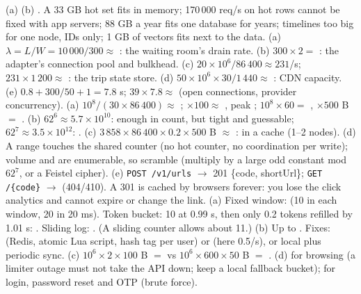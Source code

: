  (a)  (b) . A 33 GB hot set fits in memory; 170\,000 req/s on hot rows cannot be fixed with app servers; 88 GB a year fits one database for years; timelines too big for one node, IDs only; 1 GB of vectors fits next to the data.
 (a) $\lambda = L/W = 10\,000/300 \approx$ : the waiting room's drain rate. (b) $300 \times 2 =$ : the adapter's connection pool and bulkhead. (c) $20 \times 10^6/86\,400 \approx 231$/s; $231 \times 1\,200 \approx$ : the trip state store. (d) $50 \times 10^6 \times 30/1\,440 \approx$ : CDN capacity. (e) $0.8 + 300/50 + 1 = 7.8$ s; $39 \times 7.8 \approx$  (open connections, provider concurrency).
 (a) $10^8/(30 \times 86\,400) \approx$ ; $\times 100 \approx$ , peak ; $10^8 \times 60 =$ , $\times 500$ B $=$ . (b) $62^6 \approx 5.7 \times 10^{10}$: enough in count, but tight and guessable; $62^7 \approx 3.5 \times 10^{12}$: . (c) $3\,858 \times 86\,400 \times 0.2 \times 500$ B $\approx$ : in a cache (1--2 nodes). (d) A range touches the shared counter  (no hot counter, no coordination per write);  volume and are enumerable, so scramble (multiply by a large odd constant mod $62^7$, or a Feistel cipher). (e) \texttt{POST /v1/urls} $\to$ 201 \{code, shortUrl\}; \texttt{GET /\{code\}} $\to$  (404/410). A 301 is cached by browsers forever: you lose the click analytics and cannot expire or change the link.
 (a) Fixed window:  (10 in each window, 20 in 20 ms). Token bucket: 10 at 0.99 s, then only 0.2 tokens refilled by 1.01 s: . Sliding log: . (A sliding counter allows about 11.) (b) Up to . Fixes:  (Redis, atomic Lua script, hash tag per user) or  (here 0.5/s), or local plus periodic sync. (c) $10^6 \times 2 \times 100$ B $=$  vs $10^6 \times 600 \times 50$ B $=$ . (d)  for browsing (a limiter outage must not take the API down; keep a local fallback bucket);  for login, password reset and OTP (brute force).
